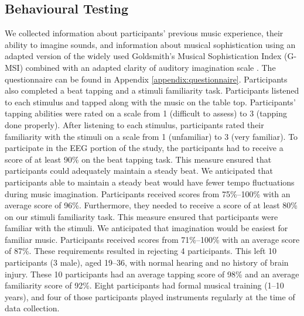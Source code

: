 \subsection{Behavioural Testing}
We collected information about participants' previous music experience, their ability to imagine sounds, and information about musical sophistication using an adapted version of the widely used Goldsmith's Musical Sophistication Index (G-MSI) \cite{mullensiefen_musicality_2014} combined with an adapted clarity of auditory imagination scale \cite{willander_imagery_scale_2010}. 
The questionnaire can be found in Appendix \ref{appendix:questionnaire}.
Participants also completed a beat tapping and a stimuli familiarity task. 
Participants listened to each stimulus and tapped along with the music on the table top. 
Participants'  tapping abilities were rated on a scale from 1 (difficult to assess) to 3 (tapping done properly). 
After listening to each stimulus, participants rated their familiarity with the stimuli on a scale from 1 (unfamiliar) to 3 (very familiar).
To participate in the \ac{EEG} portion of the study, the participants had to receive a score of at least 90\% on the beat tapping task.
This measure ensured that participants could adequately maintain a steady beat.
We anticipated that participants able to maintain a steady beat would have fewer tempo fluctuations during music imagination.
Participants received scores from 75\%--100\% with an average score of 96\%.
Furthermore, they needed to receive a score of at least 80\% on our stimuli familiarity task. 
This measure ensured that participants were familiar with the stimuli.
We anticipated that imagination would be easiest for familiar music.
Participants received scores from 71\%--100\% with an average score of 87\%.
These requirements resulted in rejecting 4 participants.
This left 10 participants (3 male), aged 19--36, with normal hearing and no history of brain injury. 
These 10 participants had an average tapping score of 98\% and an average familiarity score of 92\%.
Eight participants had formal musical training (1--10 years), and four of those participants played instruments regularly at the time of data collection.

